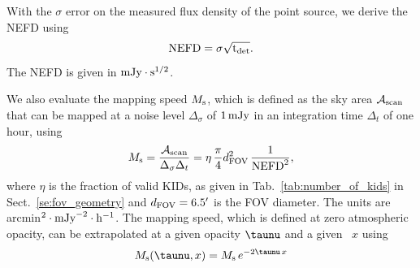 
With the $\sigma$ error on the measured flux density of
the point source, we derive the NEFD using
\begin{equation}
  \rm{NEFD} = \sigma \sqrt{t_{\rm{det}}}. 
  \label{eq:nefd_det}
\end{equation}
The NEFD is given in $\rm{mJy}\cdot s^{1/2}$.

We also evaluate the mapping speed $M_{\rm{s}}$, which is defined as the sky area
$\mathcal{A}_{\rm{scan}}$ that can be mapped at a noise level
$\Delta_\sigma$ of $1\,\rm{mJy}$ in an integration time $\Delta_t$ of
one hour, using
%
\begin{equation}
M_{\rm{s}} = \frac{\mathcal{A}_{\rm{scan}}}{\Delta_\sigma\Delta_t} = \eta \, \frac{\pi}{4} d_{\rm{FOV}}^2 \, \frac{1}{\rm{NEFD}^2},
\label{eq:mapping_speed}
\end{equation}
%
where $\eta$ is the fraction of valid KIDs, as given in
Tab.~\ref{tab:number_of_kids} in Sect.~\ref{se:fov_geometry} and
$d_{\rm{FOV}} = 6.5'$ is the FOV diameter. The units are
arcmin$^2 \cdot \rm{mJy}^{-2} \cdot \rm{h}^{-1}$. 
The mapping speed, which is defined at zero atmospheric opacity, can be extrapolated at a given opacity $\taunu$
and a given \airmass\ $x$ using
\begin{equation}
  M_{\rm{s}}(\taunu, x) = M_{\rm{s}}\, e^{-2 \taunu \, x}
  \label{eq:ms_extrapol}
\end{equation}

